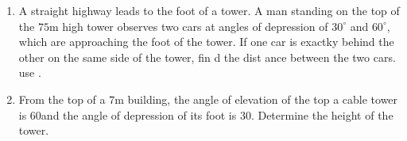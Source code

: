 \begin{enumerate}[label=\thesubsection.\arabic*.,ref=\thesubsection.\theenumi]
\item
	A straight highway leads to the foot of a tower. A man standing on the top of the $75 \mathrm{m}$ high tower observes two cars at angles of depression of $30^\circ$ and $60^\circ$, which are approaching the foot of the tower. If one car is exactky behind the other on the same side of the tower, fin
d the dist
ance between the two cars. use .
\hfill{}\item
	From the top of a $7 \mathrm{m}$ building, the angle of elevation of the top a cable tower is 60\degree and the angle of depression of its foot is 30\degree. Determine the height of the tower.

\hfill{}

\end{enumerate}
